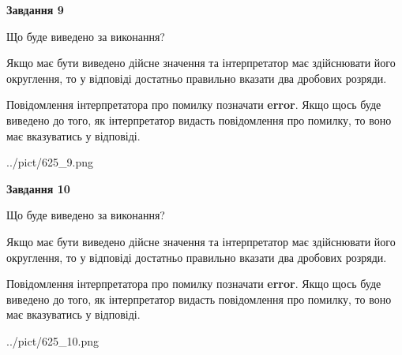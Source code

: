 \documentclass[12pt, ukrainian]{article}
\begin{document}
{\begin {Large}
{\begin {center}\textbf{Завдання 9}\end {center}}\par
Що буде виведено за виконання? \par

Якщо має бути виведено дійсне значення та інтерпретатор має здійснювати його округлення, 
то у відповіді достатньо правильно вказати два дробових розряди.

Повідомлення інтерпретатора про помилку позначати \textbf{error}.
Якщо щось буде виведено до того, як інтерпретатор видасть повідомлення про помилку, 
то воно має вказуватись у відповіді. \par

\begin{center}
	{../pict/625_9.png}
\end{center}
\newpage

{\begin {center}\textbf{Завдання 10}\end {center}}\par
Що буде виведено за виконання? \par

Якщо має бути виведено дійсне значення та інтерпретатор має здійснювати його округлення, 
то у відповіді достатньо правильно вказати два дробових розряди.

Повідомлення інтерпретатора про помилку позначати \textbf{error}.
Якщо щось буде виведено до того, як інтерпретатор видасть повідомлення про помилку, 
то воно має вказуватись у відповіді. \par

\begin{center}
	{../pict/625_10.png}
\end{center}
\newpage

\end {Large}}
\end{document}
